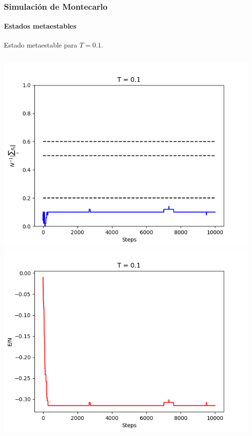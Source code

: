 \documentclass[11pt]{beamer}
\begin{document}
\begin{frame}
\frametitle{Simulación de Montecarlo}
\framesubtitle{Estados metaestables}
Estado metaestable para $T = 0.1$.
\begin{columns}
 \includegraphics[width=\linewidth]{magnet_meta_T=0,1.png}
 \includegraphics[width=\linewidth]{ener_meta_T=0,1.png}
\end{columns}
\end{frame}
\end{document}
